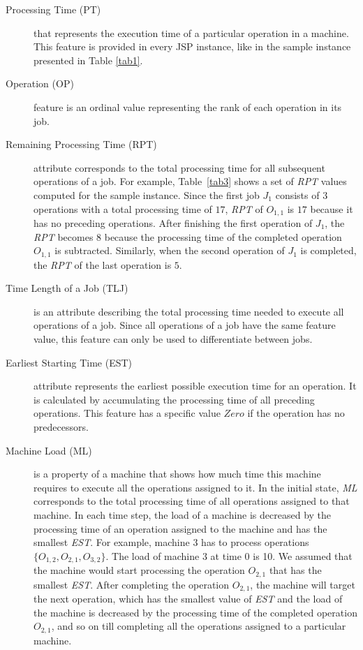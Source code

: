 \documentclass[runningheads]{llncs}
\begin{document}
\begin{description}
  \item[Processing Time (PT)] that represents the execution time of a particular operation in a machine. This feature is provided in every JSP instance, like in the sample instance presented in Table \ref{tab1}.
  
  \item[Operation (OP)] feature is an ordinal value representing the rank of each operation in its job.

  \item[Remaining Processing Time (RPT)] attribute corresponds to the total processing time for all subsequent operations of a job. For example, Table~\ref{tab3} shows a set of \textit{RPT} values computed for the sample instance. Since the first job $J_1$ consists of $3$ operations with a total processing time of $17$, \textit{RPT} of $O_{1,1}$ is $17$ because it has no preceding operations. After finishing the first operation of $J_1$, the \textit{RPT} becomes $8$ because the processing time of the completed operation $O_{1,1}$ is subtracted. Similarly, when the second operation of $J_1$ is completed, the \textit{RPT} of the last operation is $5$. 
  
  \item[Time Length of a Job (TLJ)] is an attribute describing the total processing time needed to execute all operations of a job. Since all operations of a job have the same feature value, this feature can only be used to differentiate between jobs.
  
  \item[Earliest Starting Time (EST)] attribute represents the earliest possible execution time for an operation. It is calculated by accumulating the processing time of all preceding operations. This feature has a specific value $\mathit{Zero}$ if the operation has no predecessors.
  
  \item[Machine Load (ML)] is a property of a machine that shows how much time this machine requires to execute all the operations assigned to it. In the initial state, \textit{ML} corresponds to the total processing time of all operations assigned to that machine. In each time step, the load of a machine is decreased by the processing time of an operation assigned to the machine and has the smallest \textit{EST}. For example, machine $3$ has to process operations $\{ O_{1,2}, O_{2,1}, O_{3,2} \}$. The load of machine $3$ at time $0$ is 10. We assumed that the machine would start processing the operation $O_{2,1}$ that has the smallest \textit{EST}. After completing the operation $O_{2,1}$, the machine will target the next operation, which has the smallest value of \textit{EST} and the load of the machine is decreased by the processing time of the completed operation $O_{2,1}$, and so on till completing all the operations assigned to a particular machine.
  

\end{description}
\end{document}
